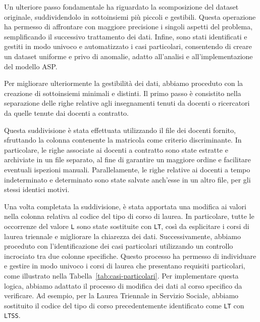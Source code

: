 Un ulteriore passo fondamentale ha riguardato la scomposizione del dataset originale, 
suddividendolo in sottoinsiemi più piccoli e gestibili. Questa operazione ha permesso 
di affrontare con maggiore precisione i singoli aspetti del problema, semplificando il 
successivo trattamento dei dati. Infine, sono stati identificati e gestiti in modo 
univoco e automatizzato i casi particolari, consentendo di creare un dataset uniforme 
e privo di anomalie, adatto all'analisi e all'implementazione del modello ASP.

Per migliorare ulteriormente la gestibilità dei dati, abbiamo proceduto con la creazione 
di sottoinsiemi minimali e distinti. Il primo passo è consistito nella separazione delle 
righe relative agli insegnamenti tenuti da docenti o ricercatori da quelle tenute dai 
docenti a contratto.

Questa suddivisione è stata effettuata utilizzando il file dei docenti fornito, 
sfruttando la colonna contenente la matricola come criterio discriminante. In particolare, 
le righe associate ai docenti a contratto sono state estratte e archiviate in un file separato, 
al fine di garantire un maggiore ordine e facilitare eventuali ispezioni manuali. 
Parallelamente, le righe relative ai docenti a tempo indeterminato e determinato sono 
state salvate anch'esse in un altro file, per gli stessi identici motivi.

Una volta completata la suddivisione, è stata apportata una modifica ai valori nella colonna 
relativa al codice del tipo di corso di laurea. In particolare, tutte le occorrenze del 
valore \texttt{L} sono state sostituite con \texttt{LT}, così da esplicitare i corsi di 
laurea triennale e migliorare la chiarezza dei dati. Successivamente, abbiamo proceduto con 
l'identificazione dei casi particolari utilizzando un controllo incrociato tra due colonne 
specifiche. Questo processo ha permesso di individuare e gestire in modo univoco i corsi 
di laurea che presentano requisiti particolari, come illustrato nella 
Tabella~\ref{tab:casi-particolari}.
Per implementare questa logica, abbiamo adattato il processo di modifica dei dati al corso 
specifico da verificare. Ad esempio, per la Laurea Triennale in Servizio Sociale, abbiamo 
sostituito il codice del tipo di corso precedentemente identificato come \texttt{LT} con 
\texttt{LTSS}.


